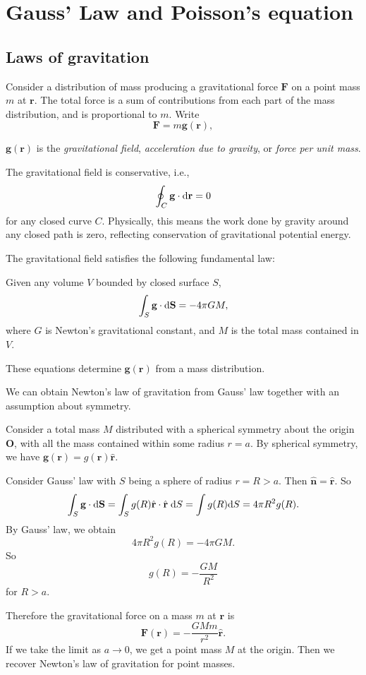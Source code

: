 \documentclass[a4paper]{article}
\begin{document}
\section{Gauss' Law and Poisson's equation}
\subsection{Laws of gravitation}
Consider a distribution of mass producing a gravitational force $\mathbf{F}$ on a point mass $m$ at $\mathbf{r}$. The total force is a sum of contributions from each part of the mass distribution, and is proportional to $m$. Write
\[
  \mathbf{F} = m\mathbf{g}(\mathbf{r}),
\]
\begin{defi}
  $\mathbf{g}(\mathbf{r})$ is the \emph{gravitational field}, \emph{acceleration due to gravity}, or \emph{force per unit mass}.
\end{defi}
The gravitational field is conservative, i.e.,
\[
  \oint_C \mathbf{g}\cdot \mathrm{d} \mathbf{r} = 0
\]
for any closed curve $C$. Physically, this means the work done by gravity around any closed path is zero, reflecting conservation of gravitational potential energy.

The gravitational field satisfies the following fundamental law:
\begin{law}
  Given any volume $V$ bounded by closed surface $S$,
  \[
    \int_S \mathbf{g}\cdot \mathrm{d} \mathbf{S} = -4\pi GM,
  \]
  where $G$ is Newton's gravitational constant, and $M$ is the total mass contained in $V$.
\end{law}
These equations determine $\mathbf{g}(\mathbf{r})$ from a mass distribution.

\begin{eg}
  We can obtain Newton's law of gravitation from Gauss' law together with an assumption about symmetry.

  Consider a total mass $M$ distributed with a spherical symmetry about the origin $\mathbf{O}$, with all the mass contained within some radius $r = a$. By spherical symmetry, we have $\mathbf{g}(\mathbf{r}) = g(\mathbf{r})\hat{\mathbf{r}}$.

  Consider Gauss' law with $S$ being a sphere of radius $r = R > a$. Then $\hat{\mathbf{n}} = \hat{\mathbf{r}}$. So
  \[
    \int_S \mathbf{g}\cdot \mathrm{d} \mathbf{S} = \int_S g(R)\hat{\mathbf{r}}\cdot \hat{\mathbf{r}}\;\mathrm{d} S = \int g(R)\mathrm{d} S = 4\pi R^2 g(R).
  \]
  By Gauss' law, we obtain
  \[
    4\pi R^2 g(R) = -4\pi GM.
  \]
  So
  \[
    g(R) = -\frac{GM}{R^2}
  \]
  for $R > a$.

  Therefore the gravitational force on a mass $m$ at $\mathbf{r}$ is
  \[
    \mathbf{F}(\mathbf{r}) = -\frac{GMm}{r^2}\hat{\mathbf{r}}.
  \]
  If we take the limit as $a\to 0$, we get a point mass $M$ at the origin. Then we recover Newton's law of gravitation for point masses.
\end{eg}
\end{document}
